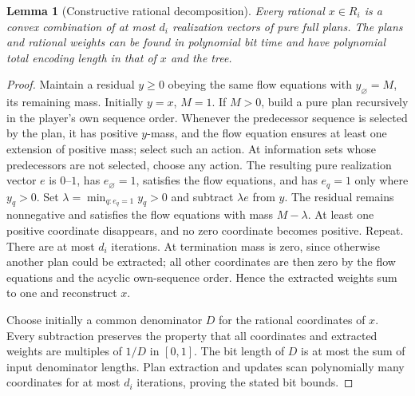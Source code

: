\documentclass[11pt]{article}
\newtheorem{lemma}[theorem]{Lemma}
\theoremstyle{definition}
\begin{document}
\begin{lemma}[Constructive rational decomposition]
Every rational $x\in R_i$ is a convex combination of at most $d_i$ realization
vectors of pure full plans. The plans and rational weights can be found in
polynomial bit time and have polynomial total encoding length in that of $x$
and the tree.
\end{lemma}
\begin{proof}
Maintain a residual $y\geq0$ obeying the same flow equations with
$y_\varnothing=M$, its remaining mass. Initially $y=x$, $M=1$.
If $M>0$, build a pure plan recursively in the player's own sequence order.
Whenever the predecessor sequence is selected by the plan, it has positive
$y$-mass, and the flow equation ensures at least one extension of positive
mass; select such an action. At information sets whose predecessors are not
selected, choose any action. The resulting pure realization vector $e$ is
$0$--$1$, has $e_\varnothing=1$, satisfies the flow equations, and has
$e_q=1$ only where $y_q>0$.
Set $\lambda=\min_{q:e_q=1}y_q>0$ and subtract $\lambda e$ from $y$.
The residual remains nonnegative and satisfies the flow equations with mass
$M-\lambda$. At least one positive coordinate disappears, and no zero
coordinate becomes positive. Repeat. There are at most $d_i$ iterations.
At termination mass is zero, since otherwise another plan could be extracted;
all other coordinates are then zero by the flow equations and the acyclic
own-sequence order. Hence the extracted weights sum to one and reconstruct $x$.

Choose initially a common denominator $D$ for the rational coordinates of $x$.
Every subtraction preserves the property that all coordinates and extracted
weights are multiples of $1/D$ in $[0,1]$. The bit length of $D$ is at most the
sum of input denominator lengths. Plan extraction and updates scan polynomially
many coordinates for at most $d_i$ iterations, proving the stated bit bounds.
\end{proof}
\end{document}
